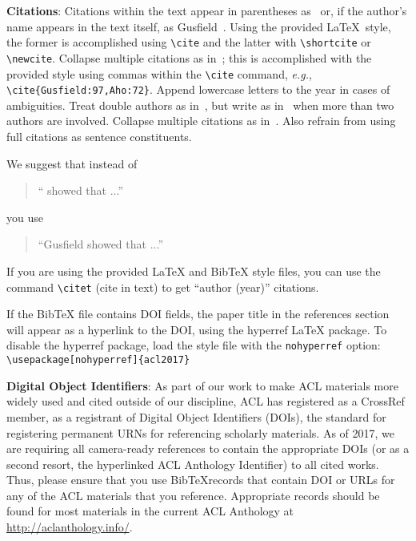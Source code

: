 \documentclass[11pt,a4paper]{article}
\begin{document}
{\bf Citations}: Citations within the text appear in parentheses
as~\cite{Gusfield:97} or, if the author's name appears in the text
itself, as Gusfield~.
Using the provided \LaTeX\ style, the former is accomplished using
{\small\verb|\cite|} and the latter with {\small\verb|\shortcite|} or {\small\verb|\newcite|}.  Collapse multiple citations as in~\cite{Gusfield:97,Aho:72}; this is accomplished with the provided style using commas within the {\small\verb|\cite|} command, {\em e.g.}, {\small\verb|\cite{Gusfield:97,Aho:72}|}.  
Append lowercase letters to the year in cases of ambiguities.  
 Treat double authors as
in~\cite{Aho:72}, but write as in~\cite{Chandra:81} when more than two
authors are involved. Collapse multiple citations as
in~\cite{Gusfield:97,Aho:72}. Also refrain from using full citations
as sentence constituents.


We suggest that instead of
\begin{quote}
  ``\cite{Gusfield:97} showed that ...''
\end{quote}
you use
\begin{quote}
``Gusfield    showed that ...''
\end{quote}

If you are using the provided \LaTeX{} and Bib\TeX{} style files, you
can use the command \verb|\citet| (cite in text)
to get ``author (year)'' citations.

If the Bib\TeX{} file contains DOI fields, the paper
title in the references section will appear as a hyperlink
to the DOI, using the hyperref \LaTeX{} package.
To disable the hyperref package, load the style file
with the \verb|nohyperref| option:
\verb|\usepackage[nohyperref]{acl2017}|

\textbf{Digital Object Identifiers}:  As part of our work to make ACL
materials more widely used and cited outside of our discipline, ACL
has registered as a CrossRef member, as a registrant of Digital Object
Identifiers (DOIs), the standard for registering permanent URNs for
referencing scholarly materials.  As of 2017, we are requiring all
camera-ready references to contain the appropriate DOIs (or as a
second resort, the hyperlinked ACL Anthology Identifier) to all cited
works.  Thus, please ensure that you use Bib\TeX records that contain
DOI or URLs for any of the ACL materials that you reference.
Appropriate records should be found for most materials in the current
ACL Anthology at \url{http://aclanthology.info/}.
\end{document}
